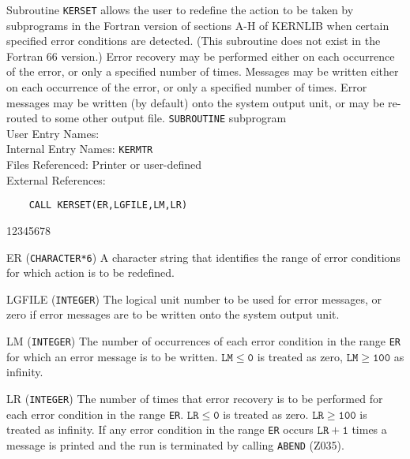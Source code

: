                           
                            
\Submitter{}                                  
                       
\begin{center}
\end{center}
Subroutine {\tt KERSET} allows the user to redefine the action to be
taken by subprograms in the Fortran version of sections A-H of
KERNLIB when certain specified error conditions are detected.
(This subroutine does not exist in the Fortran 66 version.)
Error recovery may be performed either on each occurrence of the error,
or only a specified number of times. Messages may be written either on
each occurrence of the error, or only a specified number of times. Error
messages may be written (by default) onto the system output unit, or
may be re-routed to some other output file.
\Structure
{\tt SUBROUTINE} subprogram \\
User Entry Names: \\
Internal Entry Names: {\tt KERMTR}\\
Files Referenced: Printer or user-defined\\
External References:  
\Usage
\begin{verbatim}
    CALL KERSET(ER,LGFILE,LM,LR)
\end{verbatim}
\begin{DLtt}{12345678}
\item [ER] ({\tt CHARACTER*6}) A character string that identifies the
range of error conditions for which action is to be redefined.
\item [LGFILE]({\tt INTEGER}) The logical unit number to be used
for error messages, or zero if error messages are to be written
onto the system output unit.
\item [LM] ({\tt INTEGER}) The number of occurrences of each error
condition in the range {\tt ER} for which an error message is to be
written. $\mathtt{LM \leq 0}$ is treated as zero, $\mathtt{LM \geq 100}$
as infinity.
\item [LR] ({\tt INTEGER}) The number of times that error
recovery is to be performed for each error condition in the range
{\tt ER}. $\mathtt{LR \leq 0} $ is treated as zero.
$\mathtt{LR \geq 100}$ is treated as infinity. If any error condition in
the range {\tt ER} occurs $\mathtt{LR+1}$ times a message is printed and
the run is terminated by calling {\tt ABEND} (Z035).
\end{DLtt}
